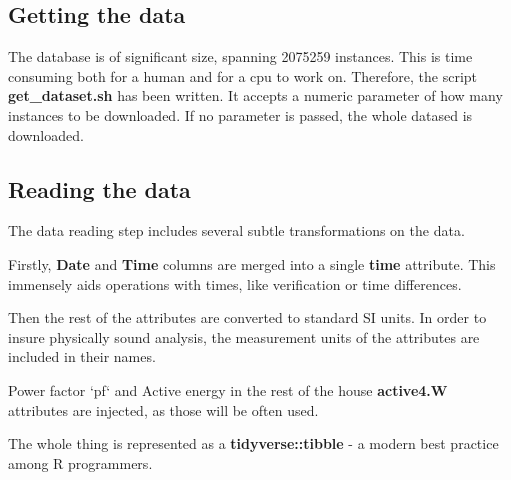 \documentclass[11pt]{article}
\newcommand{\code}[1]{\textbf{#1}}
\newcommand{\para}[0]{\par\vspace{0.5cm}}
\begin{document}
\subsection{Getting the data}
The database is of significant size, spanning 2075259 instances.
This is time consuming both for a human and for a cpu to work on.
Therefore, the script \code{get\_dataset.sh} has been written.
It accepts a numeric parameter of how many instances to be downloaded.
If no parameter is passed, the whole datased is downloaded.

\subsection{Reading the data}
The data reading step includes several subtle transformations on the data.
\para
Firstly, \code{Date} and \code{Time} columns are merged into a single \code{time} attribute.
This immensely aids operations with times, like verification or time differences.
\para
Then the rest of the attributes are converted to standard SI units.
In order to insure physically sound analysis, the measurement units of the attributes are included in their names.
\para
Power factor `pf` and Active energy in the rest of the house \code{active4.W} attributes are injected, as those will be often used.
\para
The whole thing is represented as a \code{tidyverse::tibble} - a modern best practice among R programmers. 
\end{document}
